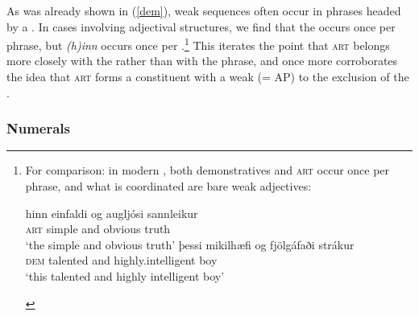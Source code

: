 \documentclass[output=paper,colorlinks,citecolor=brown]{langscibook}
\begin{document}
 As was already shown in (\ref{dem}), weak sequences often occur in  phrases headed by a . In cases involving adjectival  structures, we find that the  occurs once per  phrase, but \textit{(h)inn} occurs once per .\footnote{For comparison: in modern , both demonstratives and \textsc{art} occur once per  phrase, and what is coordinated are bare weak adjectives: 
\begin{exe}
\ex \label{xx2}   
    \begin{xlist}
        \ex \gll  hinn einfaldi og augljósi sannleikur \\  
        \textsc{art} simple and obvious truth    \\
        \glt `the simple and obvious truth'
         \ex\gll   þessi mikilhæfi  og fjölgáfaði strákur \\
         \textsc{dem} talented and highly.intelligent boy  \\
         \glt`this talented and highly intelligent boy'
\end{xlist} 
\end{exe} }   This  iterates the point that \textsc{art} belongs more closely with the  rather than with the  phrase, and once more corroborates  the idea  that \textsc{art} forms a constituent with a weak   (= AP) to the exclusion of the . 




\subsubsection{Numerals}
\label{sec:9:numi}
\end{document}
